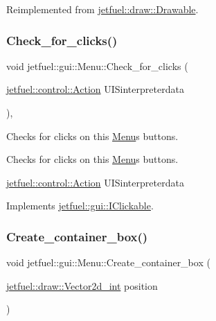 Reimplemented from \hyperlink{classjetfuel_1_1draw_1_1Drawable_a0d7257f197d6ffcdd89c3a99c93d1400}{jetfuel\+::draw\+::\+Drawable}.

\mbox{\label{classjetfuel_1_1gui_1_1Menu_a17298e1cec290db84ab4e3b1b13bd614}} 
\subsubsection{\texorpdfstring{Check\+\_\+for\+\_\+clicks()}{Check\_for\_clicks()}}
{\footnotesize\ttfamily void jetfuel\+::gui\+::\+Menu\+::\+Check\+\_\+for\+\_\+clicks (\begin{DoxyParamCaption}\item[{\hyperlink{structjetfuel_1_1control_1_1Action}{jetfuel\+::control\+::\+Action}}]{U\+I\+Sinterpreterdata }\end{DoxyParamCaption})\hspace{0.3cm}{\ttfamily [override]}, {\ttfamily [virtual]}}



Checks for clicks on this \hyperlink{classjetfuel_1_1gui_1_1Menu}{Menu}\textquotesingle{}s buttons. 

Checks for clicks on this \hyperlink{classjetfuel_1_1gui_1_1Menu}{Menu}\textquotesingle{}s buttons.

\hyperlink{structjetfuel_1_1control_1_1Action}{jetfuel\+::control\+::\+Action} U\+I\+Sinterpreterdata 

Implements \hyperlink{classjetfuel_1_1gui_1_1IClickable_aea45de37bd3beb7eb7e2e3056e4e37b3}{jetfuel\+::gui\+::\+I\+Clickable}.

\mbox{\label{classjetfuel_1_1gui_1_1Menu_a1efd742a6622d24a3ed6ae6a05fcba63}} 
\subsubsection{\texorpdfstring{Create\+\_\+container\+\_\+box()}{Create\_container\_box()}}
{\footnotesize\ttfamily void jetfuel\+::gui\+::\+Menu\+::\+Create\+\_\+container\+\_\+box (\begin{DoxyParamCaption}\item[{\hyperlink{classjetfuel_1_1draw_1_1Vector2d}{jetfuel\+::draw\+::\+Vector2d\+\_\+int}}]{position }\end{DoxyParamCaption})\hspace{0.3cm}{\ttfamily [protected]}}




